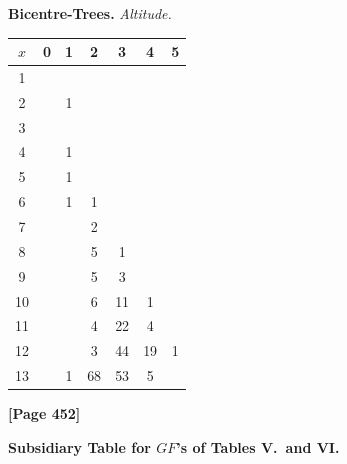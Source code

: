 \documentclass[11pt,a4paper]{book}
\begin{document}
\begin{small}
\noindent\textbf{Bicentre-Trees.} \textit{Altitude.}
\begin{center}
\begin{tabular}{|c|cccccc|}
\hline
$x$ & 0 & 1 & 2 & 3 & 4 & 5 \\
\hline
1 & & & & & & \\
2 & & 1 & & & & \\
3 & & & & & & \\
4 & & 1 & & & & \\
5 & & 1 & & & & \\
6 & & 1 & 1 & & & \\
7 & & & 2 & & & \\
8 & & & 5 & 1 & & \\
9 & & & 5 & 3 & & \\
10 & & & 6 & 11 & 1 & \\
11 & & & 4 & 22 & 4 & \\
12 & & & 3 & 44 & 19 & 1 \\
13 & & 1 & 68 & 53 & 5 & \\
\hline
\end{tabular}
\end{center}
\end{small}

\newpage
\textbf{[Page 452]}

\begin{center}
\textbf{Subsidiary Table for $GF$'s of Tables V.\ and VI.}
\end{center}
\end{document}
